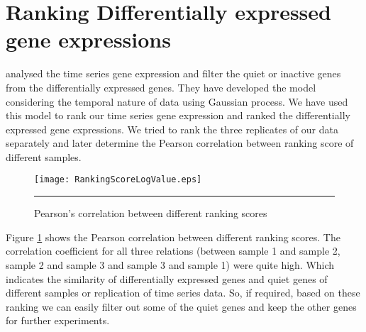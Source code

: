 
\section{Ranking Differentially expressed gene expressions}
\cite{Kalaitzis:2011} analysed the time series gene expression and filter the quiet or inactive genes from the differentially expressed genes. They have developed the model considering the temporal nature of data using Gaussian process. We have used this model to rank our time series gene expression and ranked the differentially expressed gene expressions. We tried to rank the three replicates of our data separately and later determine the Pearson correlation between ranking score of different samples.

\begin{figure}
	\centering
		\texttt{[image: RankingScoreLogValue.eps]}
		\rule{35em}{0.5pt}
	\caption[Pearson's correlation between different ranking scores]
		{Pearson's correlation between different ranking scores}
	\label{fig:ranking_scores}
\end{figure}

Figure \ref{fig:ranking_scores} shows the Pearson correlation between different ranking scores.
The correlation coefficient for all three relations (between sample 1 and sample 2, sample 2 and sample 3 and
sample 3 and sample 1) were quite high. Which indicates the similarity of 
differentially expressed genes and quiet genes of different samples or replication of time series data.
So, if required, based on these ranking we can easily filter out some of the quiet genes and keep the
other genes for further experiments.


